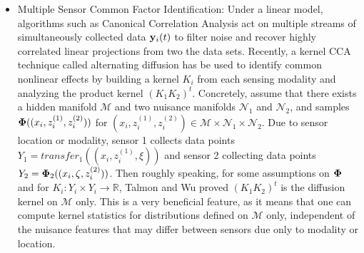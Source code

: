 \begin{itemize}
\item Multiple Sensor Common Factor Identification: 
Under a linear model, algorithms such as Canonical Correlation Analysis \cite{hardoon2004canonical} act on multiple streams of simultaneously collected data $\mathbf{y}_i(t)$ to filter noise and recover highly correlated linear projections from two the data sets.
Recently, a kernel CCA technique called alternating diffusion \cite{lederman2018learning} has be used to identify common nonlinear effects by building a kernel $K_i$ from each sensing modality and analyzing the product kernel $(K_1 K_2)^t$.   Concretely, assume that there exists a hidden manifold $\mathcal{M}$ and two nuisance manifolds $\mathcal{N}_1$ and $\mathcal{N}_2$, and samples $\mathbf{\Phi}((x_i,z_i^{(1)}, z_i^{(2)}))$ for $(x_i,z_i^{(1)}, z_i^{(2)})\in \mathcal{M}\times \mathcal{N}_1\times \mathcal{N}_2$.  Due to sensor location or modality, sensor 1 collects data points $Y_1 = transfer_1((x_i,z_i^{(1)}, \xi))$ and sensor 2 collecting data points $Y_2 = \mathbf{\Phi}_2((x_i,\zeta,z_i^{(2)}))$.  Then roughly speaking, for some assumptions on $\mathbf{\Phi}$ and for $K_i: Y_i\times Y_i \rightarrow \mathbb{R}$,
Talmon and Wu \cite{talmon2018latent} proved $(K_1 K_2)^t$ is the diffusion kernel on $\mathcal{M}$ only.   This is a very beneficial feature, as it means that one can compute kernel statistics for distributions defined on $\mathcal{M}$ only, independent of the nuisance features that may differ between sensors due only to modality or location.



\end{itemize}
